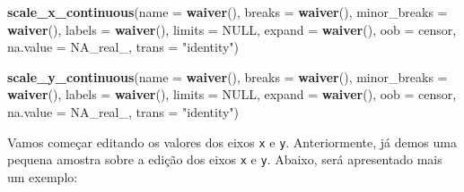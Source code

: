 \documentclass[]{book}
\newenvironment{Shaded}{\begin{snugshade}}{\end{snugshade}}
\newcommand{\KeywordTok}[1]{\textcolor[rgb]{0.13,0.29,0.53}{\textbf{#1}}}
\newcommand{\DataTypeTok}[1]{\textcolor[rgb]{0.13,0.29,0.53}{#1}}
\newcommand{\DecValTok}[1]{\textcolor[rgb]{0.00,0.00,0.81}{#1}}
\newcommand{\StringTok}[1]{\textcolor[rgb]{0.31,0.60,0.02}{#1}}
\newcommand{\OtherTok}[1]{\textcolor[rgb]{0.56,0.35,0.01}{#1}}
\newcommand{\ControlFlowTok}[1]{\textcolor[rgb]{0.13,0.29,0.53}{\textbf{#1}}}
\newcommand{\OperatorTok}[1]{\textcolor[rgb]{0.81,0.36,0.00}{\textbf{#1}}}
\newcommand{\NormalTok}[1]{#1}
\begin{document}
\begin{Shaded}
\begin{Highlighting}[]
\KeywordTok{scale_x_continuous}\NormalTok{(}\DataTypeTok{name =} \KeywordTok{waiver}\NormalTok{(), }\DataTypeTok{breaks =} \KeywordTok{waiver}\NormalTok{(), }\DataTypeTok{minor_breaks =} \KeywordTok{waiver}\NormalTok{(),}
                   \DataTypeTok{labels =} \KeywordTok{waiver}\NormalTok{(), }\DataTypeTok{limits =} \OtherTok{NULL}\NormalTok{, }\DataTypeTok{expand =} \KeywordTok{waiver}\NormalTok{(),}
                   \DataTypeTok{oob =}\NormalTok{ censor, }\DataTypeTok{na.value =} \OtherTok{NA_real_}\NormalTok{, }\DataTypeTok{trans =} \StringTok{"identity"}\NormalTok{)}

\KeywordTok{scale_y_continuous}\NormalTok{(}\DataTypeTok{name =} \KeywordTok{waiver}\NormalTok{(), }\DataTypeTok{breaks =} \KeywordTok{waiver}\NormalTok{(), }\DataTypeTok{minor_breaks =} \KeywordTok{waiver}\NormalTok{(),}
                   \DataTypeTok{labels =} \KeywordTok{waiver}\NormalTok{(), }\DataTypeTok{limits =} \OtherTok{NULL}\NormalTok{, }\DataTypeTok{expand =} \KeywordTok{waiver}\NormalTok{(),}
                   \DataTypeTok{oob =}\NormalTok{ censor, }\DataTypeTok{na.value =} \OtherTok{NA_real_}\NormalTok{, }\DataTypeTok{trans =} \StringTok{"identity"}\NormalTok{)}
\end{Highlighting}
\end{Shaded}

Vamos começar editando os valores dos eixos \texttt{x} e \texttt{y}.
Anteriormente, já demos uma pequena amostra sobre a edição dos eixos
\texttt{x} e \texttt{y}. Abaixo, será apresentado mais um exemplo:

\begin{Shaded}
\end{Shaded}
\end{document}
